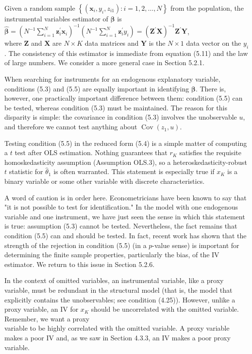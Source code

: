 \documentclass[10pt]{article}
\begin{document}
Given a random sample $\left\{\left(\mathbf{x}_{i}, y_{i}, z_{i 1}\right): i=1,2, \ldots, N\right\}$ from the population, the instrumental variables estimator of $\boldsymbol{\beta}$ is\\
$\hat{\boldsymbol{\beta}}=\left(N^{-1} \sum_{i=1}^{N} \mathbf{z}_{i}^{\prime} \mathbf{x}_{i}\right)^{-1}\left(N^{-1} \sum_{i=1}^{N} \mathbf{z}_{i}^{\prime} y_{i}\right)=\left(\mathbf{Z}^{\prime} \mathbf{X}\right)^{-1} \mathbf{Z}^{\prime} \mathbf{Y}$,\\
where $\mathbf{Z}$ and $\mathbf{X}$ are $N \times K$ data matrices and $\mathbf{Y}$ is the $N \times 1$ data vector on the $y_{i}$. The consistency of this estimator is immediate from equation (5.11) and the law of large numbers. We consider a more general case in Section 5.2.1.

When searching for instruments for an endogenous explanatory variable, conditions (5.3) and (5.5) are equally important in identifying $\boldsymbol{\beta}$. There is, however, one practically important difference between them: condition (5.5) can be tested, whereas condition (5.3) must be maintained. The reason for this disparity is simple: the covariance in condition (5.3) involves the unobservable $u$, and therefore we cannot test anything about $\operatorname{Cov}\left(z_{1}, u\right)$.

Testing condition (5.5) in the reduced form (5.4) is a simple matter of computing a $t$ test after OLS estimation. Nothing guarantees that $r_{K}$ satisfies the requisite homoskedasticity assumption (Assumption OLS.3), so a heteroskedasticity-robust $t$ statistic for $\hat{\theta}_{1}$ is often warranted. This statement is especially true if $x_{K}$ is a binary variable or some other variable with discrete characteristics.

A word of caution is in order here. Econometricians have been known to say that "it is not possible to test for identification." In the model with one endogenous variable and one instrument, we have just seen the sense in which this statement is true: assumption (5.3) cannot be tested. Nevertheless, the fact remains that condition (5.5) can and should be tested. In fact, recent work has shown that the strength of the rejection in condition (5.5) (in a $p$-value sense) is important for determining the finite sample properties, particularly the bias, of the IV estimator. We return to this issue in Section 5.2.6.

In the context of omitted variables, an instrumental variable, like a proxy variable, must be redundant in the structural model (that is, the model that explicitly contains the unobservables; see condition (4.25)). However, unlike a proxy variable, an IV for $x_{K}$ should be uncorrelated with the omitted variable. Remember, we want a proxy\\
variable to be highly correlated with the omitted variable. A proxy variable makes a poor IV and, as we saw in Section 4.3.3, an IV makes a poor proxy variable.
\end{document}
